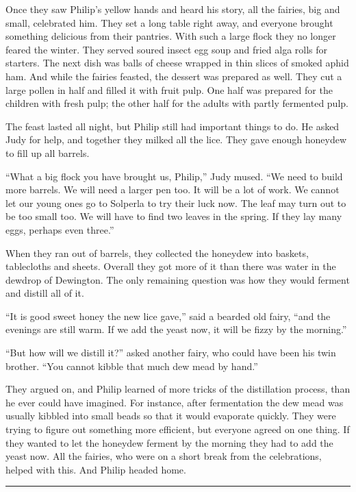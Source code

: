 \documentclass[10pt, draft]{memoir}
\renewcommand{\pfbreakdisplay}{\bigskip \ding{166} \bigskip}
\newcommand{\secbreak}{\fancybreak{\pfbreakdisplay}}
\begin{document}
Once they saw Philip's yellow hands and heard his story, all the fairies, big
and small, celebrated him. They set a long table right away, and everyone
brought something delicious from their pantries. With such a large flock they
no longer feared the winter. They served soured insect egg soup and fried alga
rolls for starters. The next dish was balls of cheese wrapped in thin slices of
smoked aphid ham. And while the fairies feasted, the dessert was prepared as
well. They cut a large pollen in half and filled it with fruit pulp. One half
was prepared for the children with fresh pulp; the other half for the adults
with partly fermented pulp.

The feast lasted all night, but Philip still had important things to do. He
asked Judy for help, and together they milked all the lice. They gave enough
honeydew to fill up all barrels.

``What a big flock you have brought us, Philip,'' Judy mused. ``We need to
build more barrels. We will need a larger pen too. It will be a lot of work. We
cannot let our young ones go to Solperla to try their luck now. The leaf may
turn out to be too small too. We will have to find two leaves in the spring. If
they lay many eggs, perhaps even three.''

When they ran out of barrels, they collected the honeydew into baskets,
tablecloths and sheets. Overall they got more of it than there was water in the
dewdrop of Dewington. The only remaining question was how they would ferment
and distill all of it.

``It is good sweet honey the new lice gave,'' said a bearded old fairy, ``and
the evenings are still warm. If we add the yeast now, it will be fizzy by the
morning.''

``But how will we distill it?'' asked another fairy, who could have been his
twin brother. ``You cannot kibble that much dew mead by hand.''

They argued on, and Philip learned of more tricks of the distillation process,
than he ever could have imagined. For instance, after fermentation the dew mead
was usually kibbled into small beads so that it would evaporate quickly. They
were trying to figure out something more efficient, but everyone agreed on one
thing. If they wanted to let the honeydew ferment by the morning they had to
add the yeast now. All the fairies, who were on a short break from the
celebrations, helped with this. And Philip headed home.

\secbreak
\end{document}
